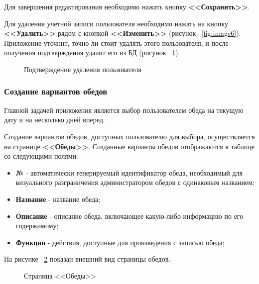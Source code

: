 \documentclass[a4paper]{article}
\begin{document}
Для завершения редактирования необходимо нажать кнопку \textbf{<<Сохранить>>}.

Для удаления учетной записи пользователя необходимо нажать на кнопку \textbf{<<Удалить>>} рядом с кнопкой \textbf{<<Изменить>>} (рисунок ~\ref{fig:image6}). Приложение уточнит, точно ли стоит удалять этого пользователя, и после получения подтверждения удалит его из БД (рисунок ~\ref{fig:image9}).

\begin{figure}[h]
\caption{Подтверждение удаления пользователя}
\label{fig:image9}
\end{figure} 

\subsubsection{Создание вариантов обедов}

Главной задачей приложения является выбор пользователем обеда на текущую дату и на несколько дней вперед. 

Создание вариантов обедов, доступных пользователю для выбора, осуществляется на странице \textbf{<<Обеды>>}. Созданные варианты обедов отображаются в таблице со следующими полями:

\begin{itemize}
\setlength{\itemsep}{-2mm}
	\item \textbf{№} - автоматически генерируемый идентификатор обеда, необходимый для визуального разграничения администратором обедов с одинаковым названием;
	\item \textbf{Название} - название обеда;
	\item \textbf{Описание} - описание обеда, включающее какую-либо информацию по его содержимому;
	\item \textbf{Функции} - действия, доступные для произведения с записью обеда; 
\end{itemize}

На рисунке ~\ref{fig:image10} показан внешний вид страницы обедов. 

\begin{figure}[h]
\caption{Страница <<Обеды>>}
\label{fig:image10}
\end{figure}
\end{document}
